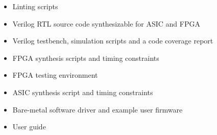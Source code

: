 %

\begin{itemize}
  \itemsep-0.5em
\item Linting scripts
\item Verilog RTL source code synthesizable for ASIC and FPGA
\item Verilog testbench, simulation scripts and a code coverage report
\item FPGA synthesis scripts  and timing constraints
\item FPGA testing environment
\item ASIC synthesis script and timing constraints
\item Bare-metal software driver and example user firmware
\item User guide
\end{itemize}
